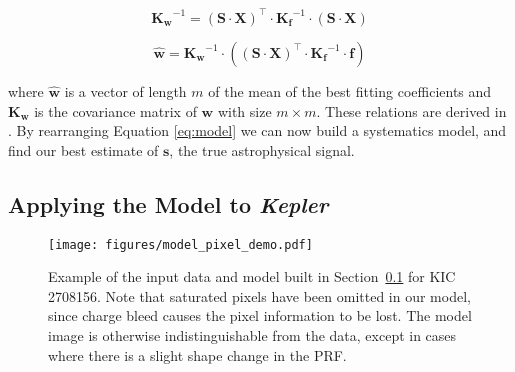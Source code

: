\documentclass[iop]{emulateapj}
\newcommand{\kepler}{\emph{Kepler}\xspace}
\newcommand{\target}{KIC 2708156\xspace}
\newcommand{\sa}{(\mathbf{S} \cdot \mathbf{X})}
\begin{document}
\begin{equation}
    \label{eq:sigmainv}
    \mathbf{K_\mathbf{w}}^{-1}= \sa^\intercal \cdot \mathbf{K_\mathbf{f}}^{-1} \cdot \sa
\end{equation}

\begin{equation}
    \label{eq:what}
    \mathbf{\hat{w}} = \mathbf{K_w}^{-1} \cdot \left(\sa^\intercal \cdot \mathbf{K_f}^{-1} \cdot \mathbf{f} \right)
\end{equation}

where $\mathbf{\hat{w}}$ is a vector of length $m$ of the mean of the best fitting coefficients and $\mathbf{K_w}$ is the covariance matrix of $\mathbf{w}$ with size $m \times m$. These relations are derived in \cite{themagic}. By rearranging Equation \ref{eq:model} we can now build a systematics model, and find our best estimate of $\mathbf{s}$, the true astrophysical signal.



\subsection{Applying the Model to \kepler}
\label{sec:keplermodel}


\begin{figure}
    \centering
    \texttt{[image: figures/model\_pixel\_demo.pdf]}
    \caption{Example of the input data and model built in Section~\ref{sec:keplermodel} for \target. Note that saturated pixels have been omitted in our model, since charge bleed causes the pixel information to be lost. The model image is otherwise indistinguishable from the data, except in cases where there is a slight shape change in the PRF.}
    \label{fig:pix_model_demo}
\end{figure}
\end{document}

